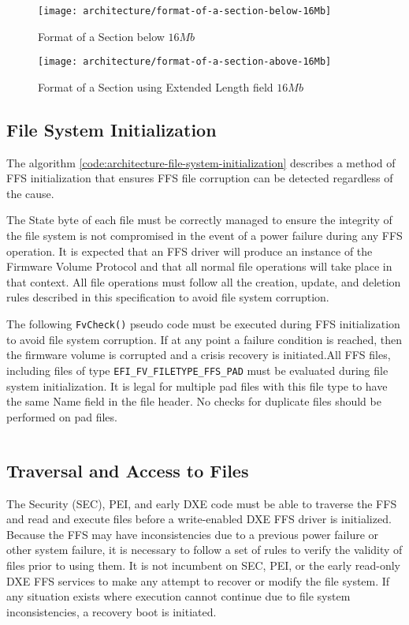 \begin{figure}[!htbp]
	\centering
	\texttt{[image: architecture/format-of-a-section-below-16Mb]}
	\caption{Format of a Section below $ 16Mb $}\label{fig:architecture-format-of-a-section-below-16Mb}
\end{figure}

\begin{figure}[!htbp]
	\centering
	\texttt{[image: architecture/format-of-a-section-above-16Mb]}
	\caption{Format of a Section using Extended Length field $ 16Mb $}\label{fig:architecture-format-of-a-section-above-16Mb}
\end{figure}


\subsection{File System Initialization}\label{subsection:file-system-initialization}
The algorithm \ref{code:architecture-file-system-initialization} describes a method of FFS initialization that ensures FFS file corruption can be detected regardless of the cause.

The State byte of each file must be correctly managed to ensure the integrity of the file system is
not compromised in the event of a power failure during any FFS operation. It is expected that an FFS
driver will produce an instance of the Firmware Volume Protocol and that all normal file operations
will take place in that context. All file operations must follow all the creation, update, and deletion
rules described in this specification to avoid file system corruption.

The following \verb|FvCheck()| pseudo code must be executed during FFS initialization to avoid file
system corruption. If at any point a failure condition is reached, then the firmware volume is
corrupted and a crisis recovery is initiated.All FFS files, including files of type
\verb|EFI_FV_FILETYPE_FFS_PAD| must be evaluated during file system initialization. It is legal for
multiple pad files with this file type to have the same Name field in the file header. No checks for
duplicate files should be performed on pad files.

\inputminted{c}{code/architecture-file-system-initialization.c}\label{code:architecture-file-system-initialization}

\subsection{Traversal and Access to Files}
The Security (SEC), PEI, and early DXE code must be able to traverse the FFS and read and execute
files before a write-enabled DXE FFS driver is initialized. Because the FFS may have
inconsistencies due to a previous power failure or other system failure, it is necessary to follow a set
of rules to verify the validity of files prior to using them. It is not incumbent on SEC, PEI, or the
early read-only DXE FFS services to make any attempt to recover or modify the file system. If any
situation exists where execution cannot continue due to file system inconsistencies, a recovery boot
is initiated.

